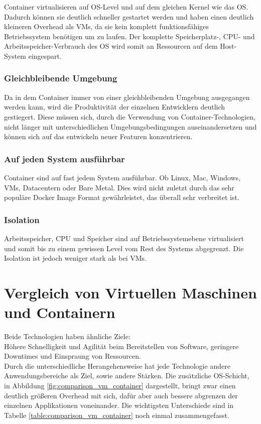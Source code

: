 Container virtualisieren auf \ac{OS}-Level und auf dem gleichen Kernel wie das \ac{OS}.
Dadurch können sie deutlich schneller gestartet werden und haben einen deutlich kleineren Overhead als \ac{VM}s, da sie kein komplett funktionsfähiges Betriebssystem benötigen um zu laufen.
Der komplette Speicherplatz-, CPU- und Arbeitsspeicher-Verbrauch des \ac{OS} wird somit an Ressourcen auf dem Host-System eingespart.

\subsubsection{Gleichbleibende Umgebung}
Da in dem Container immer von einer gleichbleibenden Umgebung ausgegangen werden kann, wird die Produktivität der einzelnen Entwicklern deutlich gestiegert.
Diese müssen sich, durch die Verwendung von Container-Technologien, nicht länger mit unterschiedlichen Umgebungsbedingungen auseinandersetzen und können sich auf das entwickeln neuer Featuren konzentrieren.

\subsubsection{Auf jeden System ausführbar}
Container sind auf fast jedem System ausführbar. 
Ob Linux, Mac, Windows, \ac{VM}s, Datacentern oder Bare Metal.
Dies wird nicht zuletzt durch das sehr populäre Docker Image Format gewährleistet, das überall sehr verbreitet ist. 

\subsubsection{Isolation}
Arbeitsspeicher, CPU und Speicher sind auf Betriebssystemebene virtualisiert und somit bis zu einem gewissen Level vom Rest des Systems abgegrenzt. 
Die Isolation ist jedoch weniger stark als bei \ac{VM}s.


\section{Vergleich von Virtuellen Maschinen und Containern}

Beide Technologien haben ähnliche Ziele: \\
Höhere Schnelligkeit und Agilität beim Bereitstellen von Software, geringere Downtimes und Einspraung von Ressourcen. \\
Durch die unterschiedliche Herangehensweise hat jede Technologie andere Anwendungsbereiche als Ziel, sowie andere Stärken.
Die zusätzliche \ac{OS}-Schicht, in Abbildung \ref{fig:comparison_vm_container} dargestellt, bringt zwar einen deutlich größeren Overhead mit sich, dafür aber auch bessere abgrenzen der einzelnen Applikationen voneinander.
Die wichtigsten Unterschiede sind in Tabelle \ref{table:comparison_vm_container} noch einmal zusammengefasst. 

